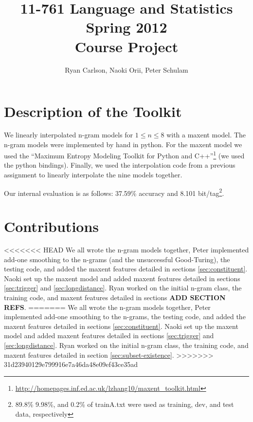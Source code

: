 \documentclass[11pt]{article}
\begin{document}
 

\title{{11-761 Language and Statistics\\Spring 2012\\Course Project}}
\author{Ryan Carlson, Naoki Orii, Peter Schulam}
\maketitle

\section{Description of the Toolkit}

We linearly interpolated n-gram models for $1 \le n \le 8$ with a maxent model. The n-gram models were implemented by hand in python. For the maxent model we used the ``Maximum Entropy Modeling Toolkit for Python and C++''\footnote{\url{http://homepages.inf.ed.ac.uk/lzhang10/maxent_toolkit.html}} (we used the python bindings). Finally, we used the interpolation code from a previous assignment to linearly interpolate the nine models together.

Our internal evaluation is as follows: 37.59\% accuracy and 8.101 bit/tag\footnote{89.8\%  9.98\%, and 0.2\% of trainA.txt were used as training, dev, and test data, respectively}.

\section{Contributions}

<<<<<<< HEAD
We all wrote the n-gram models together, Peter implemented add-one smoothing to the n-grams (and the unsuccessful Good-Turing), the testing code, and added the maxent features detailed in sections \ref{sec:constituent}. Naoki set up the maxent model and added maxent features detailed in sections \ref{sec:trigger} and \ref{sec:longdistance}. Ryan worked on the initial n-gram class, the training code, and maxent features detailed in sections \textbf{ADD SECTION REFS}.
=======
We all wrote the n-gram models together, Peter implemented add-one smoothing to the n-grams, the testing code, and added the maxent features detailed in sections \ref{sec:constituent}. Naoki set up the maxent model and added maxent features detailed in sections \ref{sec:trigger} and \ref{sec:longdistance}. Ryan worked on the initial n-gram class, the training code, and maxent features detailed in section \ref{sec:subset-existence}. 
>>>>>>> 31d23940129e799916e7a46da48e09ef43ce35ad
\end{document}
